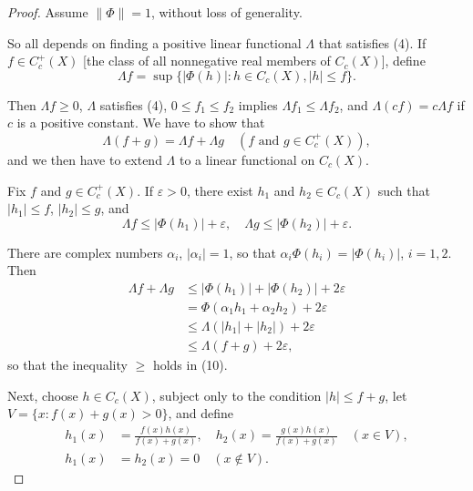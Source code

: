 \begin{proof}
  Assume $\|\Phi\| = 1$, without loss of generality.

  So all depends on finding a positive linear functional $\Lambda$ that satisfies (4).
  If $f \in C_c^+(X)$ [the class of all nonnegative real members of $C_c(X)$], define
  \begin{equation}
    \Lambda f = \sup \{|\Phi(h)| : h \in C_c(X), |h| \leq f\}. \tag{9}
  \end{equation}

  Then $\Lambda f \geq 0$, $\Lambda$ satisfies (4), $0 \leq f_1 \leq f_2$ implies $\Lambda f_1 \leq \Lambda f_2$, and $\Lambda(cf) = c\Lambda f$ if $c$ is a positive constant.
  We have to show that
  \begin{equation}
    \Lambda(f + g) = \Lambda f + \Lambda g \quad (f \text{ and } g \in C_c^+(X)), \tag{10}
  \end{equation}
  and we then have to extend $\Lambda$ to a linear functional on $C_c(X)$.

  Fix $f$ and $g \in C_c^+(X)$.
  If $\varepsilon > 0$, there exist $h_1$ and $h_2 \in C_c(X)$ such that $|h_1| \leq f$, $|h_2| \leq g$, and
  \begin{equation}
    \Lambda f \leq |\Phi(h_1)| + \varepsilon, \quad \Lambda g \leq |\Phi(h_2)| + \varepsilon. \tag{11}
  \end{equation}

  There are complex numbers $\alpha_i$, $|\alpha_i| = 1$, so that $\alpha_i \Phi(h_i) = |\Phi(h_i)|$, $i = 1, 2$.
  Then
  \begin{align}
    \Lambda f + \Lambda g & \leq |\Phi(h_1)| + |\Phi(h_2)| + 2\varepsilon      \\
                          & = \Phi(\alpha_1 h_1 + \alpha_2 h_2) + 2\varepsilon \\
                          & \leq \Lambda(|h_1| + |h_2|) + 2\varepsilon         \\
                          & \leq \Lambda(f + g) + 2\varepsilon,
  \end{align}
  so that the inequality $\geq$ holds in (10).

  Next, choose $h \in C_c(X)$, subject only to the condition $|h| \leq f + g$, let $V = \{x : f(x) + g(x) > 0\}$, and define
  \begin{align}
    h_1(x) & = \frac{f(x)h(x)}{f(x) + g(x)}, \quad h_2(x) = \frac{g(x)h(x)}{f(x) + g(x)} \quad (x \in V), \tag{12} \\
    h_1(x) & = h_2(x) = 0 \quad (x \notin V).
  \end{align}


\end{proof}
